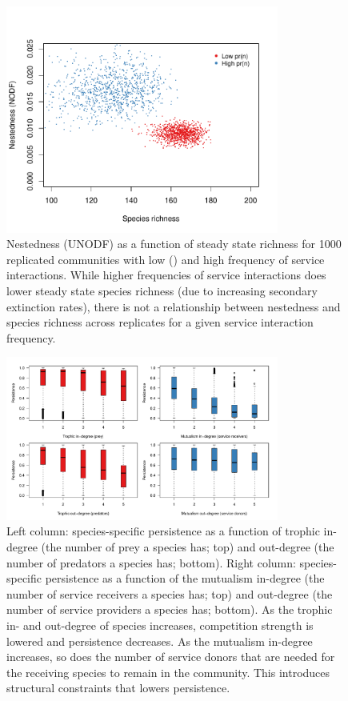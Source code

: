 \documentclass[twocolumn,preprintnumbers,amsmath,amssymb,superscriptaddress,linenumbers]{revtex4-1}
\begin{document}
\begin{figure}[h!]
\centering
\includegraphics[width=0.8\textwidth]{fig_nestedvsize.pdf}
\caption{
Nestedness (UNODF) as a function of steady state richness for 1000 replicated communities with low () and high frequency of service interactions.
While higher frequencies of service interactions does lower steady state species richness (due to increasing secondary extinction rates), there is not a relationship between nestedness and species richness across replicates for a given service interaction frequency.
}
\label{fig:nestsize}
\end{figure}




\begin{figure}[h!]
\centering
\includegraphics[width=0.8\textwidth]{fig_persistdegree_boxall.pdf}
\caption{
Left column: species-specific persistence as a function of trophic in-degree (the number of prey a species has; top) and out-degree (the number of predators a species has; bottom).
Right column: species-specific persistence as a function of the mutualism in-degree (the number of service receivers a species has; top) and out-degree (the number of service providers a species has; bottom).
As the trophic in- and out-degree of species increases, competition strength is lowered and persistence decreases.
As the mutualism in-degree increases, so does the number of service donors that are needed for the receiving species to remain in the community. This introduces structural constraints that lowers persistence.
}
\label{fig:degree}
\end{figure}
\end{document}
